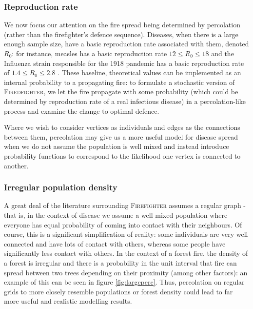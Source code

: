 \documentclass[../report.tex]{subfiles}
\begin{document}
\subsubsection{Reproduction rate}

We now focus our attention on the fire spread being determined by percolation (rather than the firefighter's defence sequence). Diseases, when there is a large enough sample size, have a basic reproduction rate associated with them, denoted $R_0$: for instance, measles has a basic reproduction rate $12\leq R_0 \leq 18$ \cite{guerra_2017} and the Influenza strain responsible for the 1918 pandemic has a basic reproduction rate of $1.4 \leq R_0 \leq 2.8$ \cite{ferguson_2006}. These baseline, theoretical values can be implemented as an internal probability to a propagating fire: to formulate a stochastic version of {\scshape Firedfighter}, we let the fire propagate with some probability (which could be determined by reproduction rate of a real infectious disease) in a percolation-like process and examine the change to optimal defence.

Where we wish to consider vertices as individuals and edges as the connections between them, percolation may give us a more useful model for disease spread when we do not assume the population is well mixed and instead introduce probability functions to correspond to the likelihood one vertex is connected to another.

\subsubsection{Irregular population density}

A great deal of the literature surrounding {\scshape Firefighter} assumes a regular graph - that is, in the context of disease we assume a well-mixed population where everyone has equal probability of coming into contact with their neighbours. Of course, this is a significant simplification of reality: some individuals are very well connected and have lots of contact with others, whereas some people have significantly less contact with others. In the context of a forest fire, the density of a forest is irregular and there is a probability in the unit interval that fire can spread between two trees depending on their proximity (among other factors): an example of this can be seen in figure \ref{fig:largeperc}. Thus, percolation on regular grids to more closely resemble populations or forest density could lead to far more useful and realistic modelling results.
\end{document}
